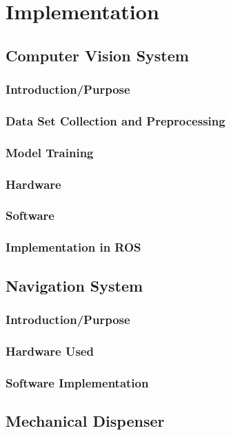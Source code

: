 \chapter{Implementation}
\label{chap:implementation}

\section{Computer Vision System}
\subsection{Introduction/Purpose}
\subsection{Data Set Collection and Preprocessing}
\subsection{Model Training}
\subsection{Hardware}
\subsection{Software}
\subsection{Implementation in ROS}

\section{Navigation System}
\subsection{Introduction/Purpose}
\subsection{Hardware Used}
\subsection{Software Implementation}

\section{Mechanical Dispenser}
